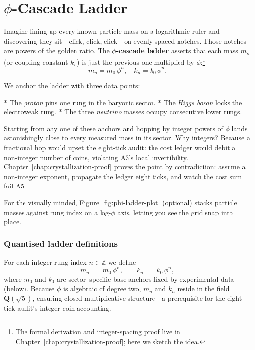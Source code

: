 \documentclass[11pt,oneside]{book}
\begin{document}
\section{\texorpdfstring{$\phi$}{phi}-Cascade Ladder}
\label{sec:phi-ladder}
Imagine lining up every known particle mass on a logarithmic ruler and
discovering they sit—click, click, click—on evenly spaced notches.  
Those notches are powers of the golden ratio.  
The \textbf{$\phi$-cascade ladder} asserts that each mass \(m_{n}\) (or
coupling constant \(k_{n}\)) is just the previous one multiplied by
\(\phi\):\footnote{The formal derivation and integer-spacing proof live in
Chapter~\ref{chap:crystallization-proof}; here we sketch the idea.}
\[
  m_{n}=m_{0}\,\phi^{n},
  \quad
  k_{n}=k_{0}\,\phi^{n}.
\]

We anchor the ladder with three data points:

* The \emph{proton} pins one rung in the baryonic sector.  
* The \emph{Higgs boson} locks the electroweak rung.  
* The three \emph{neutrino} masses occupy consecutive lower rungs.

Starting from any one of these anchors and hopping by integer powers of
\(\phi\) lands astonishingly close to every measured mass in its sector.
Why integers?  
Because a fractional hop would upset the eight-tick audit: the cost ledger
would debit a non-integer number of coins, violating A3’s local
invertibility.  Chapter~\ref{chap:crystallization-proof} proves the point by
contradiction: assume a non-integer exponent, propagate the ledger eight
ticks, and watch the cost sum fail A5.

For the visually minded, Figure~\ref{fig:phi-ladder-plot} (optional) stacks
particle masses against rung index on a log-\(\phi\) axis, letting you see the
grid snap into place.

\subsubsection{Quantised ladder definitions}
\label{subsubsec:ladder-def}
For each integer rung index \(n\in\mathbb{Z}\) we define
\[
  m_{n} \;=\; m_{0}\,\phi^{n},
  \qquad
  k_{n} \;=\; k_{0}\,\phi^{n},
\]
where \(m_{0}\) and \(k_{0}\) are sector–specific base anchors fixed by
experimental data (below).  Because \(\phi\) is algebraic of degree two,
\(m_{n}\) and \(k_{n}\) reside in the field \(\mathbf{Q}(\sqrt{5})\), ensuring
closed multiplicative structure—a prerequisite for the eight-tick audit’s
integer-coin accounting.
\end{document}

